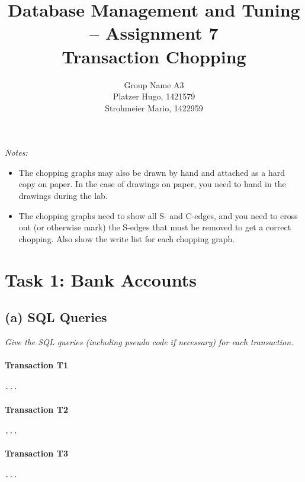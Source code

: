 \documentclass[11pt]{scrartcl}
\title{
  \textbf{\large Database Management and Tuning -- Assignment 7}\\
  Transaction Chopping
}
\author{
 Group Name A3\\
 \large Platzer Hugo, 1421579 \\
 \large Strohmeier Mario, 1422959
}
\begin{document}
\maketitle

{\it Notes:}

\begin{itemize}
\item The chopping graphs may also be drawn by hand and attached as a
  hard copy on paper. In the case of drawings on paper, you need to
  hand in the drawings during the lab.
\item The chopping graphs need to show all S- and C-edges, and you
  need to cross out (or otherwise mark) the S-edges that must be
  removed to get a correct chopping. Also show the write list for each
  chopping graph.
\end{itemize}

\section*{Task 1:  Bank Accounts}

\subsection*{(a) SQL Queries}

{\it Give the SQL queries (including pseudo code if necessary) for each
transaction.}

\paragraph{Transaction T1}

{\small
\begin{verbatim}
...
\end{verbatim}
}

\paragraph{Transaction T2}

{\small
\begin{verbatim}
...
\end{verbatim}
}

\paragraph{Transaction T3}

{\small
\begin{verbatim}
...
\end{verbatim}
}
\end{document}
